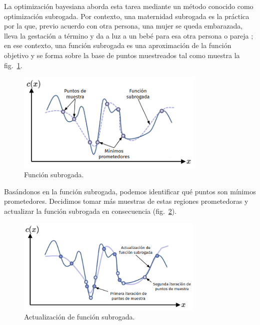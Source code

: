 \documentclass[a4paper,12pt]{article}
\begin{document}
La optimización bayesiana aborda esta tarea mediante un método conocido como optimización subrogada. Por contexto, una maternidad subrogada es la práctica por la que, previo acuerdo con otra persona, una mujer se queda embarazada, lleva la gestación a término y da a luz a un bebé para esa otra persona o pareja \citep{vientre_alquiler}; en ese contexto, una función subrogada es una aproximación de la función objetivo y se forma sobre la base de puntos muestreados tal como muestra la fig.~\ref{fig:bayes2}.

\begin{figure}[H]
	\begin{center}
		\includegraphics[width=0.8\textwidth]{bayes_opt_2_v2.png}
		\caption{Función subrogada.}
		\label{fig:bayes2}
	\end{center}
\end{figure}

Basándonos en la función subrogada, podemos identificar qué puntos son mínimos prometedores. Decidimos tomar más muestras de estas regiones prometedoras y actualizar la función subrogada en consecuencia (fig.~\ref{fig:bayes3}).

\begin{figure}[H]
	\begin{center}
		\includegraphics[width=0.8\textwidth]{bayes_opt_3_v2.png}
		\caption{Actualización de función subrogada.}
		\label{fig:bayes3}
	\end{center}
\end{figure}
\end{document}

